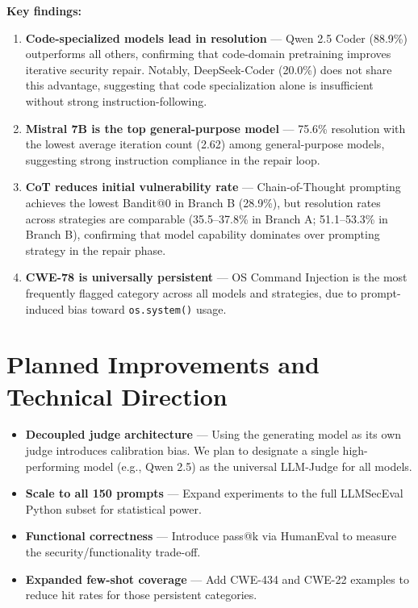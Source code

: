 \documentclass[11pt,a4paper]{article}
\begin{document}
\textbf{Key findings:}
\begin{enumerate}[noitemsep]
    \item \textbf{Code-specialized models lead in resolution} — Qwen 2.5 Coder (88.9\%) outperforms all others, confirming that code-domain pretraining improves iterative security repair. Notably, DeepSeek-Coder (20.0\%) does not share this advantage, suggesting that code specialization alone is insufficient without strong instruction-following.
    \item \textbf{Mistral 7B is the top general-purpose model} — 75.6\% resolution with the lowest average iteration count (2.62) among general-purpose models, suggesting strong instruction compliance in the repair loop.
    \item \textbf{CoT reduces initial vulnerability rate} — Chain-of-Thought prompting achieves the lowest Bandit@0 in Branch B (28.9\%), but resolution rates across strategies are comparable (35.5–37.8\% in Branch A; 51.1–53.3\% in Branch B), confirming that model capability dominates over prompting strategy in the repair phase.
    \item \textbf{CWE-78 is universally persistent} — OS Command Injection is the most frequently flagged category across all models and strategies, due to prompt-induced bias toward \texttt{os.system()} usage.
\end{enumerate}

\section{Planned Improvements and Technical Direction}

\begin{itemize}[noitemsep]
    \item \textbf{Decoupled judge architecture} — Using the generating model as its own judge introduces calibration bias. We plan to designate a single high-performing model (e.g., Qwen 2.5) as the universal LLM-Judge for all models.
    \item \textbf{Scale to all 150 prompts} — Expand experiments to the full LLMSecEval Python subset for statistical power.
    \item \textbf{Functional correctness} — Introduce pass@k via HumanEval to measure the security/functionality trade-off.
    \item \textbf{Expanded few-shot coverage} — Add CWE-434 and CWE-22 examples to reduce hit rates for those persistent categories.
\end{itemize}
\end{document}
